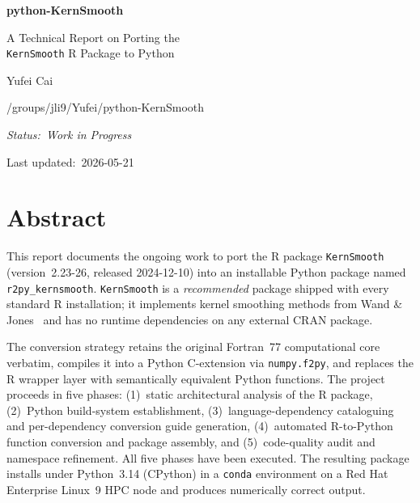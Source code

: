 \documentclass[12pt,a4paper]{article}
\begin{document}

\begin{titlepage}
  \centering
  \vspace*{3.5cm}
  {\Huge\bfseries python-KernSmooth\par}
  \vspace{0.8cm}
  {\LARGE A Technical Report on Porting the\\[0.4em]
   \texttt{KernSmooth} R Package to Python\par}
  \vspace{1.4cm}
  {\Large Yufei Cai\par}
  \vspace{0.5cm}
  {\normalsize\ttfamily /groups/jli9/Yufei/python-KernSmooth\par}
  \vfill
  {\normalsize\textit{Status:~Work in Progress}\par}
  \vspace{0.3cm}
  {\normalsize Last updated:~2026-05-21\par}
\end{titlepage}

\tableofcontents
\clearpage

\section*{Abstract}

This report documents the ongoing work to port the R package \texttt{KernSmooth} (version~2.23-26, released 2024-12-10) into an installable Python package named \texttt{r2py\_kernsmooth}. \texttt{KernSmooth} is a \emph{recommended} package shipped with every standard R installation; it implements kernel smoothing methods from Wand \& Jones~\cite{wandjones1995} and has no runtime dependencies on any external CRAN package.

The conversion strategy retains the original Fortran~77 computational core verbatim, compiles it into a Python C-extension via \texttt{numpy.f2py}, and replaces the R wrapper layer with semantically equivalent Python functions. The project proceeds in five phases: (1)~static architectural analysis of the R package, (2)~Python build-system establishment, (3)~language-dependency cataloguing and per-dependency conversion guide generation, (4)~automated R-to-Python function conversion and package assembly, and (5)~code-quality audit and namespace refinement. All five phases have been executed. The resulting package installs under Python~3.14 (CPython) in a \texttt{conda} environment on a Red Hat Enterprise Linux~9 HPC node and produces numerically correct output.
\end{document}

